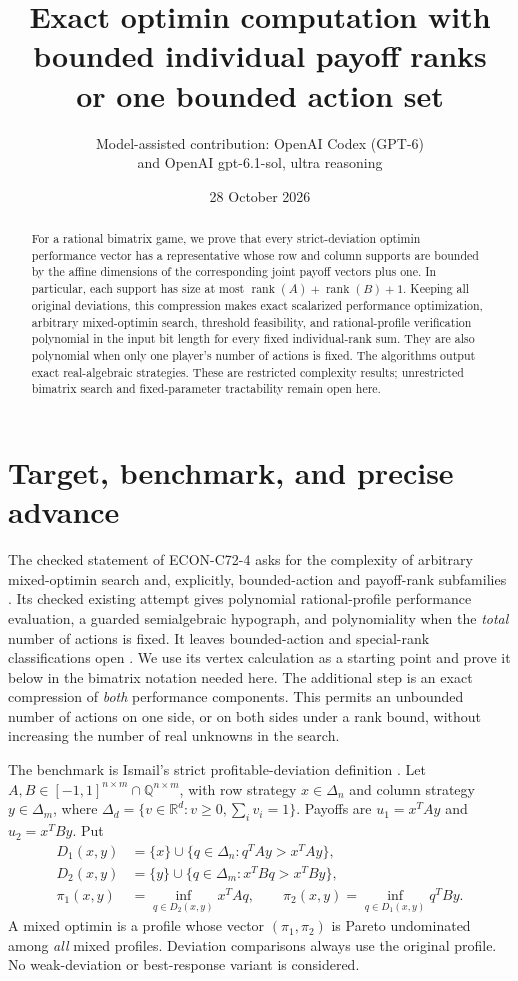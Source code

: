 \documentclass[11pt]{article}
\title{Exact optimin computation with bounded individual payoff ranks\protect\\or one bounded action set}
\author{Model-assisted contribution: OpenAI Codex (GPT-6)\protect\\and OpenAI gpt-6.1-sol, ultra reasoning}
\date{28 October 2026}
\theoremstyle{remark}
\newcommand{\R}{\mathbb R}
\newcommand{\Q}{\mathbb Q}
\newcommand{\rank}{\operatorname{rank}}
\begin{document}
\maketitle
\begin{abstract}
For a rational bimatrix game, we prove that every strict-deviation optimin performance vector has a representative whose row and column supports are bounded by the affine dimensions of the corresponding joint payoff vectors plus one. In particular, each support has size at most $\rank(A)+\rank(B)+1$. Keeping all original deviations, this compression makes exact scalarized performance optimization, arbitrary mixed-optimin search, threshold feasibility, and rational-profile verification polynomial in the input bit length for every fixed individual-rank sum. They are also polynomial when only one player's number of actions is fixed. The algorithms output exact real-algebraic strategies. These are restricted complexity results; unrestricted bimatrix search and fixed-parameter tractability remain open here.
\end{abstract}

\section{Target, benchmark, and precise advance}
The checked statement of ECON-C72-4 asks for the complexity of arbitrary mixed-optimin search and, explicitly, bounded-action and payoff-rank subfamilies \cite{statement}. Its checked existing attempt gives polynomial rational-profile performance evaluation, a guarded semialgebraic hypograph, and polynomiality when the \emph{total} number of actions is fixed. It leaves bounded-action and special-rank classifications open \cite{attempt}. We use its vertex calculation as a starting point and prove it below in the bimatrix notation needed here. The additional step is an exact compression of \emph{both} performance components. This permits an unbounded number of actions on one side, or on both sides under a rank bound, without increasing the number of real unknowns in the search.

The benchmark is Ismail's strict profitable-deviation definition \cite[Definitions 1--3]{ismail}. Let $A,B\in[-1,1]^{n\times m}\cap\Q^{n\times m}$, with row strategy $x\in\Delta_n$ and column strategy $y\in\Delta_m$, where $\Delta_d=\{v\in\R^d:v\ge0,\sum_i v_i=1\}$. Payoffs are $u_1=x^TAy$ and $u_2=x^TBy$. Put
\begin{align*}
D_1(x,y)&=\{x\}\cup\{q\in\Delta_n:q^TAy>x^TAy\},\\
D_2(x,y)&=\{y\}\cup\{q\in\Delta_m:x^TBq>x^TBy\},\\
\pi_1(x,y)&=\inf_{q\in D_2(x,y)}x^TAq,\qquad
\pi_2(x,y)=\inf_{q\in D_1(x,y)}q^TBy.
\end{align*}
A mixed optimin is a profile whose vector $(\pi_1,\pi_2)$ is Pareto undominated among \emph{all} mixed profiles. Deviation comparisons always use the original profile. No weak-deviation or best-response variant is considered.
\end{document}
